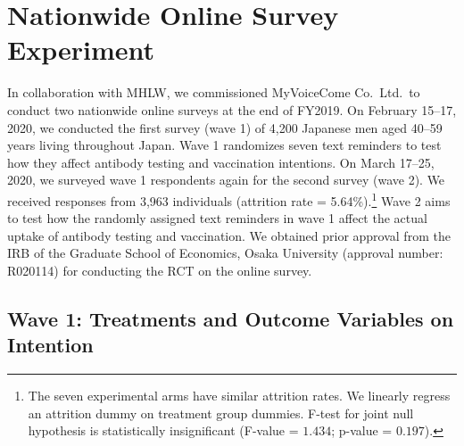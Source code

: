 \documentclass[
]{article}
\begin{document}
\hypertarget{experiment}{%
\section{Nationwide Online Survey Experiment}\label{experiment}}

In collaboration with MHLW, we commissioned MyVoiceCome Co.~Ltd.~to conduct two nationwide online surveys at the end of FY2019. On February 15--17, 2020, we conducted the first survey (wave 1) of 4,200 Japanese men aged 40--59 years living throughout Japan. Wave 1 randomizes seven text reminders to test how they affect antibody testing and vaccination intentions. On March 17--25, 2020, we surveyed wave 1 respondents again for the second survey (wave 2). We received responses from 3,963 individuals (attrition rate = 5.64\%).\footnote{The seven experimental arms have similar attrition rates. We linearly regress an attrition dummy on treatment group dummies. F-test for joint null hypothesis is statistically insignificant (F-value = \(1.434\); p-value = \(0.197\)).} Wave 2 aims to test how the randomly assigned text reminders in wave 1 affect the actual uptake of antibody testing and vaccination. We obtained prior approval from the IRB of the Graduate School of Economics, Osaka University (approval number: R020114) for conducting the RCT on the online survey.

\hypertarget{wave1}{%
\subsection{Wave 1: Treatments and Outcome Variables on Intention}\label{wave1}}
\end{document}
